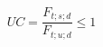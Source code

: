 \documentclass[12pt]{article}
\begin{document}
\begin{displaymath}
UC = \frac {F_{t;s;d}} {F_{t;u;d}} \leq 1
\end{displaymath}
\end{document}
